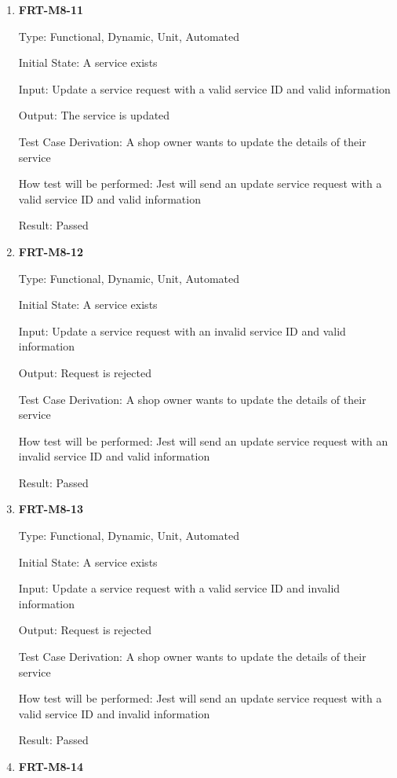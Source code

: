 \documentclass[12pt, titlepage]{article}
\begin{document}
\begin{enumerate}
	\item \textbf{FRT-M8-11}

	      Type: Functional, Dynamic, Unit, Automated

	      Initial State: A service exists

	      Input: Update a service request with a valid service ID and valid information

	      Output: The service is updated

	      Test Case Derivation: A shop owner wants to update the details of their service

	      How test will be performed: Jest will send an update service request with a valid service ID and
	      valid information

	      Result: Passed

	\item \textbf{FRT-M8-12}

	      Type: Functional, Dynamic, Unit, Automated

	      Initial State: A service exists

	      Input: Update a service request with an invalid service ID and valid information

	      Output: Request is rejected

	      Test Case Derivation: A shop owner wants to update the details of their service

	      How test will be performed: Jest will send an update service request with an invalid service ID and
	      valid information

	      Result: Passed

	\item \textbf{FRT-M8-13}

	      Type: Functional, Dynamic, Unit, Automated

	      Initial State: A service exists

	      Input: Update a service request with a valid service ID and invalid information

	      Output: Request is rejected

	      Test Case Derivation: A shop owner wants to update the details of their service

	      How test will be performed: Jest will send an update service request with a valid service ID and
	      invalid information

	      Result: Passed

	\item \textbf{FRT-M8-14}


\end{enumerate}
\end{document}
